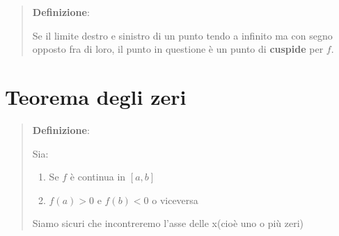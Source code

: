 \begin{quote}
    \textbf{Definizione}:

    Se il limite destro e sinistro di un punto tendo a infinito ma con segno opposto fra di loro,
    il punto in questione è un punto di \textbf{cuspide} per $f$.
\end{quote}

\section{Teorema degli zeri}
\begin{quote}
    \textbf{Definizione}:

    Sia:
    \begin{enumerate}
        \item Se $f$ è continua in $[a, b]$
        \item $f(a) > 0$ e $f(b) < 0$ o viceversa  
    \end{enumerate}

    Siamo sicuri che incontreremo l'asse delle x(cioè uno o più zeri)
\end{quote}

